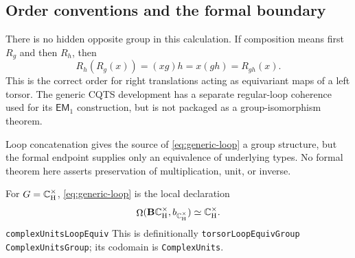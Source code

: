 \subsection{Order conventions and the formal boundary}
There is no hidden opposite group in this calculation.  If composition means
first $R_g$ and then $R_h$, then
\begin{equation}
 R_h(R_g(x))=(xg)h=x(gh)=R_{gh}(x).
\end{equation}
This is the correct order for right translations acting as equivariant maps
of a left torsor.  The generic CQTS development has a separate regular-loop
coherence used for its $\mathsf{EM}_1$ construction, but
 is not packaged as a group-isomorphism theorem.

\begin{warning}
Loop concatenation gives the source of \eqref{eq:generic-loop} a group
structure, but the formal endpoint supplies only an equivalence of underlying
types.  No formal theorem here asserts preservation of multiplication, unit,
or inverse.
\end{warning}

For $G=\mathbb{C}_{\mathrm H}^{\times}$, \eqref{eq:generic-loop} is the local declaration
\begin{equation}
 \mathop{\Omega}(\mathbf{B}\mathbb{C}_{\mathrm H}^{\times},b_{\mathbb{C}_{\mathrm H}^{\times}})\simeq\mathbb{C}_{\mathrm H}^{\times}.
\end{equation}
{\texttt{complexUnitsLoopEquiv}}
{This is definitionally \texttt{torsorLoopEquivGroup ComplexUnitsGroup}; its codomain is \texttt{ComplexUnits}.}
